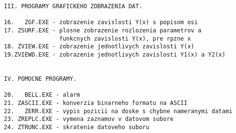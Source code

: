 \begin{verbatim}
III. PROGRAMY GRAFICKEHO ZOBRAZENIA DAT.

16.   ZGF.EXE - zobrazenie zavislosti Y(x) s popisom osi
17. ZSURF.EXE - plosne zobrazenie rozlozenia parametrov a
                funkcnych zavislosti Y(x), pre rpzne x
18. ZVIEW.EXE - zobrazenie jednotlivych zavislosti Y(x)
19.ZVIEWD.EXE - zobrazenie jednotlivych zavislosti Y1(x) a Y2(x)


IV. POMOCNE PROGRAMY.

20.   BELL.EXE - alarm
21. ZASCII.EXE - konverzia binarneho formatu na ASCII
22.   ZERR.EXE - vypis pozicii na doske s chybne nameranymi datami
23. ZREPLC.EXE - vymena zaznamov v datovom subore
24. ZTRUNC.EXE - skratenie datoveho suboru
\end{verbatim}

